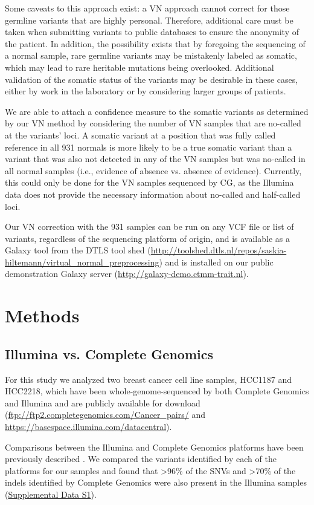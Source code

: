 Some caveats to this approach exist: a VN approach cannot correct for those germline variants that are highly personal. Therefore, additional care must be taken when submitting variants to public databases to ensure the anonymity of the patient. In addition, the possibility exists that by foregoing the sequencing of a normal sample, rare germline variants may be mistakenly labeled as somatic, which may lead to rare heritable mutations being overlooked. Additional validation of the somatic status of the variants may be desirable in these cases, either by work in the laboratory or by considering larger groups of patients.

We are able to attach a confidence measure to the somatic variants as determined by our VN method by considering the number of VN samples that are no-called at the variants’ loci. A somatic variant at a position that was fully called reference in all 931 normals is more likely to be a true somatic variant than a variant that was also not detected in any of the VN samples but was no-called in all normal samples (i.e., evidence of absence vs. absence of evidence). Currently, this could only be done for the VN samples sequenced by CG, as the Illumina data does not provide the necessary information about no-called and half-called loci.

Our VN correction with the 931 samples can be run on any VCF file or list of variants, regardless of the sequencing platform of origin, and is available as a Galaxy tool from the DTLS tool shed (\url{http://toolshed.dtls.nl/repos/saskia-hiltemann/virtual\_normal\_preprocessing}) and is installed on our public demonstration Galaxy server (\url{http://galaxy-demo.ctmm-trait.nl}).

\section*{Methods}

\subsection*{Illumina vs. Complete Genomics}

For this study we analyzed two breast cancer cell line samples, HCC1187 and HCC2218, which have been whole-genome-sequenced by both Complete Genomics and Illumina and are publicly available for download (\url{ftp://ftp2.completegenomics.com/Cancer\_pairs/} and \url{https://basespace.illumina.com/datacentral}).

Comparisons between the Illumina and Complete Genomics platforms have been previously described \cite{lam2012performance}. We compared the variants identified by each of the platforms for our samples and found that >96\% of the SNVs and >70\% of the indels identified by Complete Genomics were also present in the Illumina samples (\href{https://genome.cshlp.org/content/25/9/1382/suppl/DC1}{Supplemental Data S1}).

